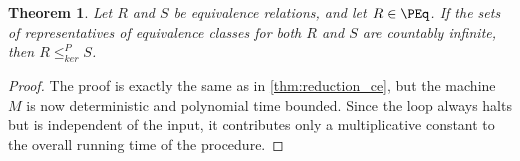 \documentclass{article}
\newtheorem{theorem}{Theorem}[section]
\theoremstyle{definition} \newtheorem{definition}[definition]{Definition}
\newcommand{\sigmastar}{\{0, 1\}^{*}} %
\newcommand{\kr}{\leq^{P}_{ker}} %
\newcommand{\pair}[2]{\langle#1,#2\rangle} %
\begin{document}
\begin{theorem}
  Let $R$ and $S$ be equivalence relations, and let $R\in\PEq$. If the sets of
  representatives of equivalence classes for both $R$ and $S$ are countably
  infinite, then $R\kr S$.
\end{theorem}
\begin{proof}
  The proof is exactly the same as in \autoref{thm:reduction_ce}, but the
  machine $M$ is now deterministic and polynomial time bounded. Since the loop
  always halts but is independent of the input, it contributes only a
  multiplicative constant to the overall running time of the procedure.
\end{proof}




\end{document}
